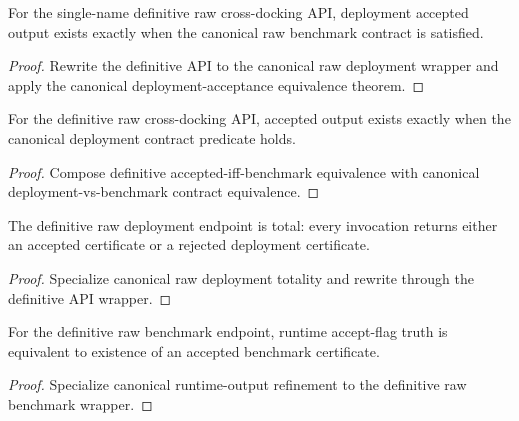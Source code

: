 \begin{theorem}\label{thm:definitive-raw-crossdock-accept-benchmark-iff}
For the single-name definitive raw cross-docking API, deployment accepted output exists exactly when the canonical raw benchmark contract is satisfied.
\end{theorem}

\begin{proof}
Rewrite the definitive API to the canonical raw deployment wrapper and apply the canonical deployment-acceptance equivalence theorem.
\end{proof}

\begin{theorem}\label{thm:definitive-raw-crossdock-accept-deployment-iff}
For the definitive raw cross-docking API, accepted output exists exactly when the canonical deployment contract predicate holds.
\end{theorem}

\begin{proof}
Compose definitive accepted-iff-benchmark equivalence with canonical deployment-vs-benchmark contract equivalence.
\end{proof}

\begin{theorem}\label{thm:definitive-raw-crossdock-totality}
The definitive raw deployment endpoint is total: every invocation returns either an accepted certificate or a rejected deployment certificate.
\end{theorem}

\begin{proof}
Specialize canonical raw deployment totality and rewrite through the definitive API wrapper.
\end{proof}

\begin{theorem}\label{thm:definitive-raw-runtime-flag-refines-accept}
For the definitive raw benchmark endpoint, runtime accept-flag truth is equivalent to existence of an accepted benchmark certificate.
\end{theorem}

\begin{proof}
Specialize canonical runtime-output refinement to the definitive raw benchmark wrapper.
\end{proof}


